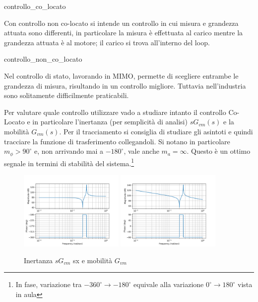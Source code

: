 {controllo_co_locato}

Con controllo non co-locato si intende un controllo in cui misura e grandezza attuata sono differenti, in particolare la misura è effettuata al carico mentre la grandezza attuata è al motore; il carico si trova all'interno del loop.

{controllo_non_co_locato}

Nel controllo di stato, lavorando in MIMO, permette di scegliere entrambe le grandezza di misura, risultando in un controllo migliore. Tuttavia nell'industria sono solitamente difficilmente praticabili. 

Per valutare quale controllo utilizzare vado a studiare intanto il controllo Co-Locato e in particolare l'inertanza (per semplicità di analisi) \(sG_{vm}(s)\) e la mobilità \(G_{vm}(s)\). Per il tracciamento si consiglia di studiare gli asintoti e quindi tracciare la funzione di trasferimento collegandoli.
Si notano in particolare \(m_\phi > 90^\circ\) e, non arrivando mai a \(-180^\circ\), vale anche \(m_a = \infty\). Questo è un ottimo segnale in termini di stabilità del sistema.\footnote{In fase, variazione tra \(-360^\circ\rightarrow -180^\circ\) equivale alla variazione \(0^\circ\rightarrow 180^\circ\) vista in aula}

\begin{figure}[h]
    \centering
    \includegraphics[width=0.45\textwidth]{Immagini/Inertanza_gvm.png}
    \includegraphics[width=0.45\textwidth]{Immagini/mobilita_gvm.png}
    \caption{Inertanza \(sG_{vm}\) sx e mobilità \(G_{vm}\)}
\end{figure}

